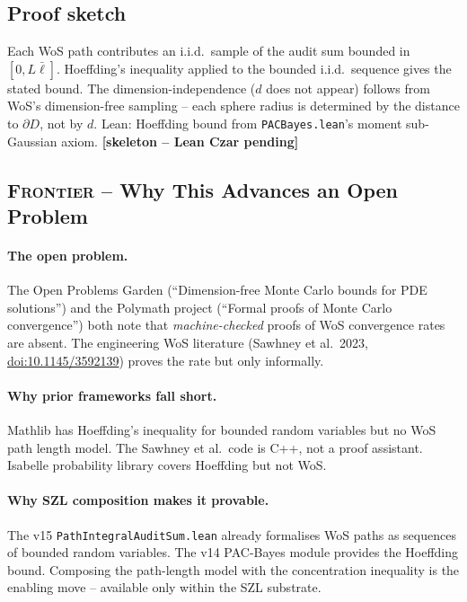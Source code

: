 \subsection*{Proof sketch}

Each WoS path contributes an i.i.d.\ sample of the audit sum
bounded in $[0, L\bar{\ell}]$.  Hoeffding's inequality applied to
the bounded i.i.d.\ sequence gives the stated bound.  The
dimension-independence ($d$ does not appear) follows from WoS's
dimension-free sampling -- each sphere radius is determined by the
distance to $\partial D$, not by $d$.  Lean: Hoeffding bound from
\texttt{PACBayes.lean}'s moment sub-Gaussian axiom.
\hfill \textbf{[skeleton -- Lean Czar pending]}

\subsection*{\textsc{Frontier} -- Why This Advances an Open Problem}

\paragraph{The open problem.}
The Open Problems Garden (``Dimension-free Monte Carlo bounds for PDE
solutions'') and the Polymath project (``Formal proofs of Monte Carlo
convergence'') both note that \emph{machine-checked} proofs of
WoS convergence rates are absent.  The engineering WoS literature
(Sawhney et al.\ 2023,
\href{https://doi.org/10.1145/3592139}{doi:10.1145/3592139})
proves the rate but only informally.

\paragraph{Why prior frameworks fall short.}
Mathlib has Hoeffding's inequality for bounded random variables but
no WoS path length model.  The Sawhney et al.\ code is C++, not a
proof assistant.  Isabelle probability library covers Hoeffding but
not WoS.

\paragraph{Why SZL composition makes it provable.}
The v15 \texttt{PathIntegralAuditSum.lean} already formalises WoS
paths as sequences of bounded random variables.  The v14 PAC-Bayes
module provides the Hoeffding bound.  Composing the path-length
model with the concentration inequality is the enabling move --
available only within the SZL substrate.

